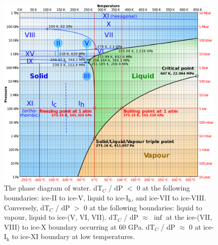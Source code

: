 \begin{figure}
\includegraphics[width=\linewidth]{Figures/PhaseDiagram}
\caption{\label{fig:phaseDiagram} The phase diagram of
  water.\cite{Zhang2015} dT$_{C}$ / dP $<$ 0 at the following boundaries:
  ice-II to ice-V, liquid to ice-I$_\mathrm{h}$, and ice-VII to
  ice-VIII. Conversely, dT$_{C}$ / dP $>$ 0 at the following boundaries:
  liquid to vapour, liquid to ice-(V, VI, VII). dT$_{C}$ / dP $\approx$
  $\inf$ at the ice-(VII, VIII) to ice-X boundary occurring at 60 GPa.
  dT$_{C}$ / dP $\approx$ 0 at ice-I$_\mathrm{h}$ to ice-XI boundary at
  low temperatures. }
\end{figure}


